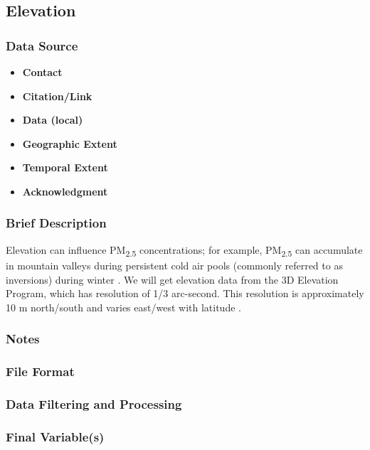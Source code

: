 \subsection{Elevation}
\subsubsection*{Data Source}
\begin{itemize}[nolistsep]
\item \textbf{Contact}
\item \textbf{Citation/Link}
\item \textbf{Data (local)}
\item \textbf{Geographic Extent}
\item \textbf{Temporal Extent}
\item \textbf{Acknowledgment}
\end{itemize}
\subsubsection*{Brief Description}

Elevation can influence PM\textsubscript{2.5} concentrations; for example, PM\textsubscript{2.5} can accumulate in mountain valleys during persistent cold air pools 
(commonly referred to as inversions) 
during winter \citep{Whiteman2014}. We will get elevation data from the 3D Elevation Program, which has resolution of 1/3 arc-second. This resolution is approximately 10 m north/south and varies east/west with latitude \citep{USGSElevation2017}.

\subsubsection*{Notes}
\subsubsection*{File Format}
\subsubsection*{Data Filtering and Processing}
\subsubsection*{Final Variable(s)}
